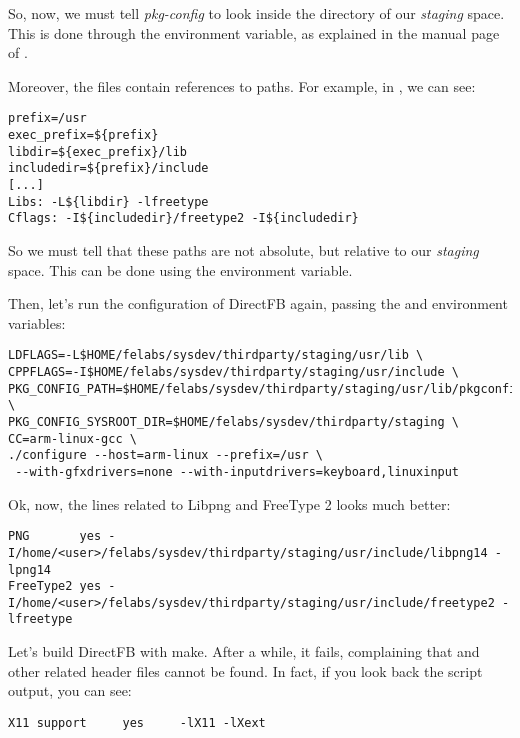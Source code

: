 So, now, we must tell {\em pkg-config} to look inside the
 directory of our {\em staging} space. This
is done through the  environment variable, as
explained in the manual page of .

Moreover, the  files contain references to paths. For
example, in
,
we can see:

\begin{verbatim}
prefix=/usr
exec_prefix=${prefix}
libdir=${exec_prefix}/lib
includedir=${prefix}/include
[...]
Libs: -L${libdir} -lfreetype
Cflags: -I${includedir}/freetype2 -I${includedir}
\end{verbatim}

So we must tell  that these paths are not absolute,
but relative to our {\em staging} space. This can be done using the
 environment variable.

Then, let's run the configuration of DirectFB again, passing the
 and  environment
variables:

\small
\begin{verbatim}
LDFLAGS=-L$HOME/felabs/sysdev/thirdparty/staging/usr/lib \
CPPFLAGS=-I$HOME/felabs/sysdev/thirdparty/staging/usr/include \
PKG_CONFIG_PATH=$HOME/felabs/sysdev/thirdparty/staging/usr/lib/pkgconfig \
PKG_CONFIG_SYSROOT_DIR=$HOME/felabs/sysdev/thirdparty/staging \
CC=arm-linux-gcc \
./configure --host=arm-linux --prefix=/usr \
 --with-gfxdrivers=none --with-inputdrivers=keyboard,linuxinput
\end{verbatim}
\normalsize

Ok, now, the lines related to Libpng and FreeType 2 looks much better:

\footnotesize
\begin{verbatim}
PNG       yes -I/home/<user>/felabs/sysdev/thirdparty/staging/usr/include/libpng14 -lpng14
FreeType2 yes -I/home/<user>/felabs/sysdev/thirdparty/staging/usr/include/freetype2 -lfreetype
\end{verbatim}
\normalsize

Let's build DirectFB with make. After a while, it fails, complaining
that \code{X11/Xlib.h} and other related header files cannot be
found. In fact, if you look back the \code{./configure} script output,
you can see:

\begin{verbatim}
X11 support		yes		-lX11 -lXext
\end{verbatim}

